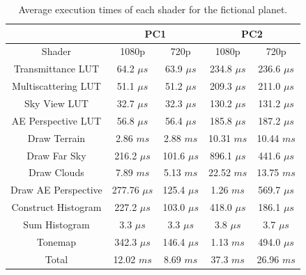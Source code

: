 \documentclass{ctuthesis}
\begin{document}
\begin{center}
\begin{table}[h]
\begin{tabular}{ ||c|c|c|c|c|| } 
\hline
& \multicolumn{2}{|c|}{PC1} & \multicolumn{2}{|c||}{PC2} \\
\hline
Shader              & 1080p          & 720p         &1080p         &  720p           \\
\hline
Transmittance LUT   & 64.2 $\mu s$   & 63.9 $\mu s$ & 234.8 $\mu s$&  236.6 $\mu s$  \\
\hline
Multiscattering LUT & 51.1 $\mu s$   & 51.2 $\mu s$ & 209.3 $\mu s$&  211.0 $\mu s$  \\
\hline
Sky View LUT        & 32.7 $\mu s$   & 32.3 $\mu s$ & 130.2 $\mu s$&  131.2 $\mu s$  \\
\hline
AE Perspective LUT  & 56.8 $\mu s$   & 56.4 $\mu s$ & 185.8 $\mu s$&  187.2 $\mu s$  \\
\hline
\hline
Draw Terrain        & 2.86 $ms$       & 2.88 $ms$     & 10.31 $ms$   &  10.44 $ms$     \\
\hline
Draw Far Sky        & 216.2 $\mu s$  & 101.6 $\mu s$& 896.1 $\mu s$&  441.6 $\mu s$  \\
\hline
Draw Clouds         & 7.89 $ms$      & 5.13 $ms$    & 22.52 $ms$    &  13.75 $ms$     \\
\hline
Draw AE Perspective & 277.76 $\mu s$  & 125.4 $\mu s$& 1.26 $ms$    &  569.7 $\mu s$  \\
\hline
\hline
Construct Histogram & 227.2 $\mu s$  & 103.0 $\mu s$& 418.0 $\mu s$&  186.1 $\mu s$  \\
\hline
Sum Histogram       & 3.3 $\mu s$    & 3.3 $\mu s$  & 3.8 $\mu s$  &  3.7 $\mu s$    \\
\hline
Tonemap             & 342.3 $\mu s$  & 146.4 $\mu s$& 1.13 $ms$    &  494.0 $\mu s$  \\
\hline
\hline
Total              & 12.02 $ms $     & 8.69 $ms$    & 37.3 $ms$    &   26.96 $ms$    \\
\hline
\end{tabular}
\caption[Fictional planet performance]{\label{tab:Fictional performance} Average execution times of each shader for the fictional planet.}
\end{table}
\end{center}
\end{document}
